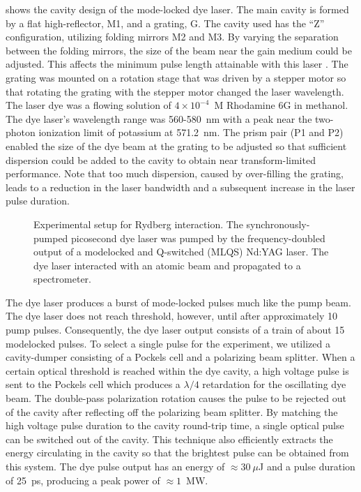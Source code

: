  shows the cavity design of the mode-locked dye laser.  The
main cavity is formed by a flat high-reflector, M1, and a grating, G.  The
cavity used has the ``Z'' configuration, utilizing folding mirrors M2 and
M3.  By varying the separation between the folding mirrors, the size of the
beam near the gain medium could be adjusted.  This affects the minimum
pulse length attainable with this laser \cite{Wisoff:85}.  The grating was
mounted on a rotation stage that was driven by a stepper motor so that
rotating the grating with the stepper motor changed the laser wavelength.  The
laser dye was a flowing solution of $4 \times 10^{-4}$~M Rhodamine 6G in
methanol.  The dye laser's wavelength range was 560-580~nm with a peak near the
two-photon ionization limit of potassium at 571.2~nm.  The prism pair (P1 and
P2) enabled the size of the dye beam at the grating to be adjusted so that
sufficient dispersion could be added to the cavity to obtain near
transform-limited performance.  Note that too much dispersion, caused by
over-filling the grating, leads to a reduction in the laser bandwidth and a
subsequent increase in the laser pulse duration.

\begin{figure}[tbp]
\bigskip
{}
{Experimental setup for Rydberg interaction.  The synchronously-pumped
picosecond dye laser was pumped by the frequency-doubled output of a modelocked
and Q-switched (MLQS) Nd:YAG laser.  The dye laser interacted with an atomic
beam and propagated to a spectrometer.
\label{gensetup}}
\end{figure}

The dye laser produces a burst of mode-locked pulses much like the pump
beam.  The dye laser does not reach threshold, however, until
after approximately 10 pump pulses.  Consequently, the dye laser output consists
of a train of about 15 modelocked pulses.  To select a single pulse for the
experiment, we utilized a cavity-dumper consisting of a Pockels cell and a
polarizing beam splitter.  When a certain optical threshold is reached within
the dye cavity, a high voltage pulse is sent to the Pockels cell which produces a
$\lambda/4$ retardation for the oscillating dye beam.  The double-pass
polarization rotation causes the pulse to be rejected out of the cavity after
reflecting off the polarizing beam splitter.  By matching the high voltage
pulse duration to the cavity round-trip time, a single
optical pulse can be switched out of the cavity.  This technique also
efficiently extracts the energy circulating in the cavity so that the brightest
pulse can be obtained from this system.  The dye pulse output has an energy of
$\approx 30~\mu$J and a pulse duration of 25~ps, producing a peak power of
$\approx 1$~MW.

